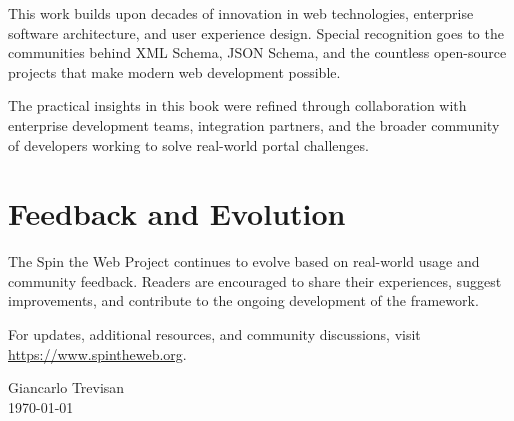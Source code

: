 This work builds upon decades of innovation in web technologies, enterprise software architecture, and user experience design. Special recognition goes to the communities behind XML Schema, JSON Schema, and the countless open-source projects that make modern web development possible.

The practical insights in this book were refined through collaboration with enterprise development teams, integration partners, and the broader community of developers working to solve real-world portal challenges.

\section*{Feedback and Evolution}

The Spin the Web Project continues to evolve based on real-world usage and community feedback. Readers are encouraged to share their experiences, suggest improvements, and contribute to the ongoing development of the framework.

For updates, additional resources, and community discussions, visit \url{https://www.spintheweb.org}.

\vspace{1cm}
\hfill Giancarlo Trevisan \\
\hfill \today

\clearpage
